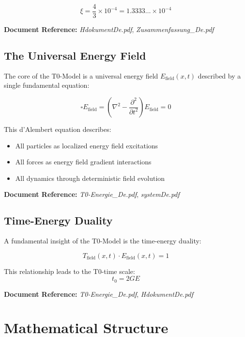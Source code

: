 \documentclass[12pt,a4paper]{article}
\newcommand{\xipar}{\xi}
\newcommand{\Efield}{E_{\text{field}}}
\begin{document}
	\begin{equation}
		\xipar = \frac{4}{3} \times 10^{-4} = 1.3333\ldots \times 10^{-4}
	\end{equation}
	
	\textbf{Document Reference:} \textit{HdokumentDe.pdf}, \textit{Zusammenfassung\_De.pdf}
	
	\subsection{The Universal Energy Field}
	
	The core of the T0-Model is a universal energy field $\Efield(x,t)$ described by a single fundamental equation:
	
	\begin{equation}
		\square \Efield = \left(\nabla^2 - \frac{\partial^2}{\partial t^2}\right) \Efield = 0
	\end{equation}
	
	This d'Alembert equation describes:
	\begin{itemize}
		\item All particles as localized energy field excitations
		\item All forces as energy field gradient interactions
		\item All dynamics through deterministic field evolution
	\end{itemize}
	
	\textbf{Document Reference:} \textit{T0-Energie\_De.pdf}, \textit{systemDe.pdf}
	
	\subsection{Time-Energy Duality}
	
	A fundamental insight of the T0-Model is the time-energy duality:
	
	\begin{equation}
		T_{\text{field}}(x,t) \cdot E_{\text{field}}(x,t) = 1
	\end{equation}
	
	This relationship leads to the T0-time scale:
	\begin{equation}
		t_0 = 2GE
	\end{equation}
	
	\textbf{Document Reference:} \textit{T0-Energie\_De.pdf}, \textit{HdokumentDe.pdf}
	
	\section{Mathematical Structure}
	
\end{document}
